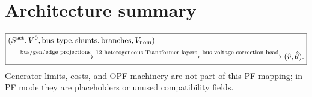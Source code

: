 \documentclass[11pt,a4paper]{article}
\begin{document}
\section{Architecture summary}
\[
\boxed{\begin{aligned}
&(S^{\rm set},V^0,\text{bus type},\text{shunts},\text{branches},V_{\rm nom})\\
&\quad\xrightarrow{\text{bus/gen/edge projections}}
\xrightarrow{12\text{ heterogeneous Transformer layers}}
\xrightarrow{\text{bus voltage correction head}}(\hat v,\hat\theta).
\end{aligned}}
\]
Generator limits, costs, and OPF machinery are not part of this PF mapping; in PF mode they are placeholders or unused compatibility fields.
\end{document}
